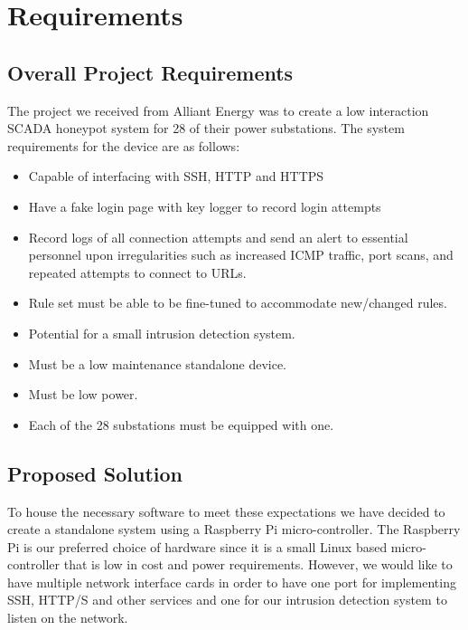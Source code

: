 \chapter{Requirements}

\section{Overall Project Requirements}

The project we received from Alliant Energy was to create a low interaction SCADA honeypot system for 28 of their power substations.  The system requirements for the device are as follows:

\begin{itemize}
    \item Capable of interfacing with SSH, HTTP and HTTPS
    \item Have a fake login page with key logger to record login attempts 
    \item Record logs of all connection attempts and send an alert to essential personnel upon irregularities such as increased ICMP traffic, port scans, and repeated attempts to connect to URLs.
    \item Rule set must be able to be fine-tuned to accommodate new/changed rules.
    \item Potential for a small intrusion detection system.
    \item Must be a low maintenance standalone device.
    \item Must be low power.
    \item Each of the 28 substations must be equipped with one.
\end{itemize}


\section{Proposed Solution}

To house the necessary software to meet these expectations we have decided to create a standalone system using a Raspberry Pi
micro-controller.  The Raspberry Pi is our preferred choice of hardware since it is a small Linux based
micro-controller that is low in cost and power requirements.  However, we would like to have multiple network interface cards in
order to have one port for implementing SSH, HTTP/S and other services and one for our intrusion detection system to listen on the network.

